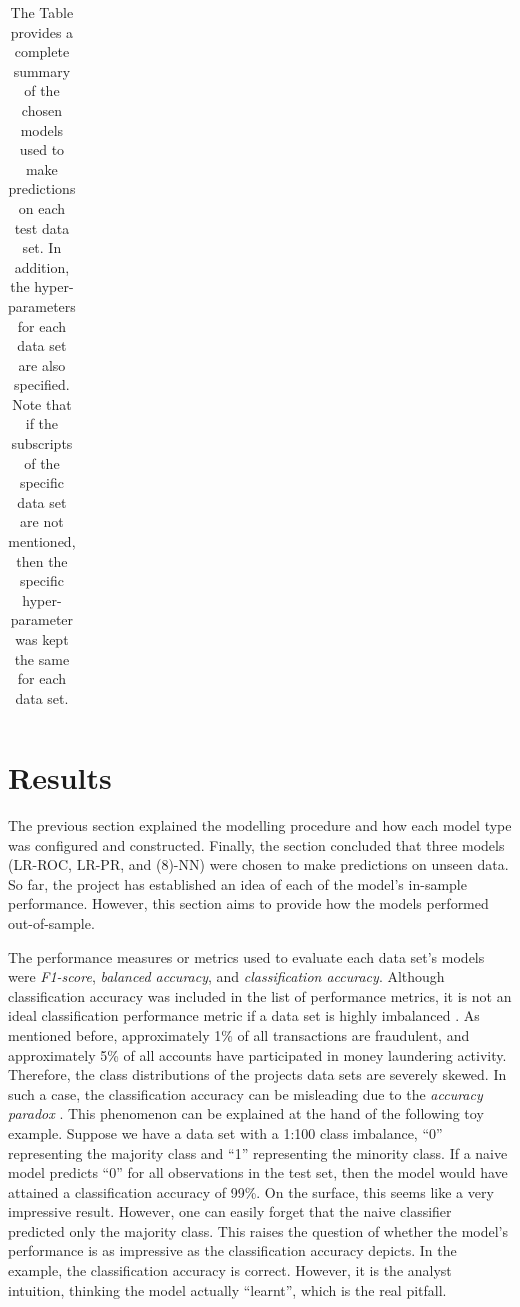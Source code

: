 \begin{table}
{\begin{tabular}{llclll}
\end{tabular}
}
\caption{The Table provides a complete summary of the chosen models used to make predictions on each test data set. In addition, the hyper-parameters for each data set are also specified. Note that if the subscripts of the specific data set are not mentioned, then the specific hyper-parameter was kept the same for each data set.}
\label{tab:ch3_model_summary}
\end{table}

\section{Results}\label{ch3_sub_heading_results}

The previous section explained the modelling procedure and how each model type was configured and constructed. Finally, the section concluded that three models (LR-ROC, LR-PR, and (8)-NN) were chosen to make predictions on unseen data. So far, the project has established an idea of each of the model's in-sample performance. However, this section aims to provide how the models performed out-of-sample.

 The performance measures or metrics used to evaluate each data set's models were \textit{F1-score}, \textit{balanced accuracy}, and \textit{classification accuracy}. Although classification accuracy was included in the list of performance metrics, it is not an ideal classification performance metric if a data set is highly imbalanced \citep*{branco2015survey}. As mentioned before, approximately 1\% of all transactions are fraudulent, and approximately 5\% of all accounts have participated in money laundering activity. Therefore, the class distributions of the projects data sets are severely skewed. In such a case, the classification accuracy can be misleading due to the \textit{accuracy paradox} \citep{branco2015survey}. This phenomenon can be explained at the hand of the following toy example. Suppose we have a data set with a 1:100 class imbalance, ``0'' representing the majority class and ``1'' representing the minority class. If a naive model predicts ``0'' for all observations in the test set, then the model would have attained a classification accuracy of 99\%. On the surface, this seems like a very impressive result. However, one can easily forget that the naive classifier predicted only the majority class. This raises the question of whether the model's performance is as impressive as the classification accuracy depicts. In the example, the classification accuracy is correct. However, it is the analyst intuition, thinking the model actually ``learnt'', which is the real pitfall. 
 
